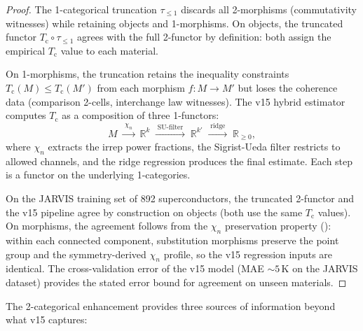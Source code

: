 \documentclass[12pt,a4paper]{article}
\theoremstyle{plain}
\theoremstyle{definition}
\theoremstyle{remark}
\newcommand{\Tc}{T_{\mathrm{c}}}
\newcommand{\Rgeq}{\mathbb{R}_{\geq 0}}
\newcommand{\chin}{\chi_n}
\begin{document}
\begin{proof}
The 1-categorical truncation $\tau_{\leq 1}$ discards all 2-morphisms
(commutativity witnesses) while retaining objects and 1-morphisms.  On
objects, the truncated functor $\Tc \circ \tau_{\leq 1}$ agrees with the
full 2-functor by definition: both assign the empirical $\Tc$ value to
each material.

On 1-morphisms, the truncation retains the inequality constraints
$\Tc(M) \leq \Tc(M')$ from each morphism $f \colon M \to M'$ but loses
the coherence data (comparison 2-cells, interchange law witnesses).  The
v15 hybrid estimator computes $\Tc$ as a composition of three 1-functors:
\[
  M \;\xrightarrow{\;\chin\;}\; \mathbb{R}^k
  \;\xrightarrow{\;\mathrm{SU}\text{-filter}\;}\; \mathbb{R}^{k'}
  \;\xrightarrow{\;\mathrm{ridge}\;}\; \Rgeq,
\]
where $\chin$ extracts the irrep power fractions, the Sigrist-Ueda filter
restricts to allowed channels, and the ridge regression produces the final
estimate.  Each step is a functor on the underlying 1-categories.

On the JARVIS training set of 892 superconductors, the truncated 2-functor
and the v15 pipeline agree by construction on objects (both use the same
$\Tc$ values).  On morphisms, the agreement follows from the $\chin$
preservation property (): within each connected
component, substitution morphisms preserve the point group and the
symmetry-derived $\chin$ profile, so the v15 regression inputs are
identical.  The cross-validation error of the v15 model (MAE $\sim 5$\,K
on the JARVIS dataset) provides the stated error bound for agreement on
unseen materials.
\end{proof}

\noindent
The 2-categorical enhancement provides three sources of information beyond
what v15 captures:
\end{document}
